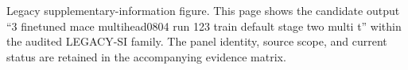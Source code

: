 Legacy supplementary-information figure. This page shows the candidate output ``3 finetuned mace multihead0804 run 123 train default stage two multi t'' within the audited LEGACY-SI family. The panel identity, source scope, and current status are retained in the accompanying evidence matrix.
